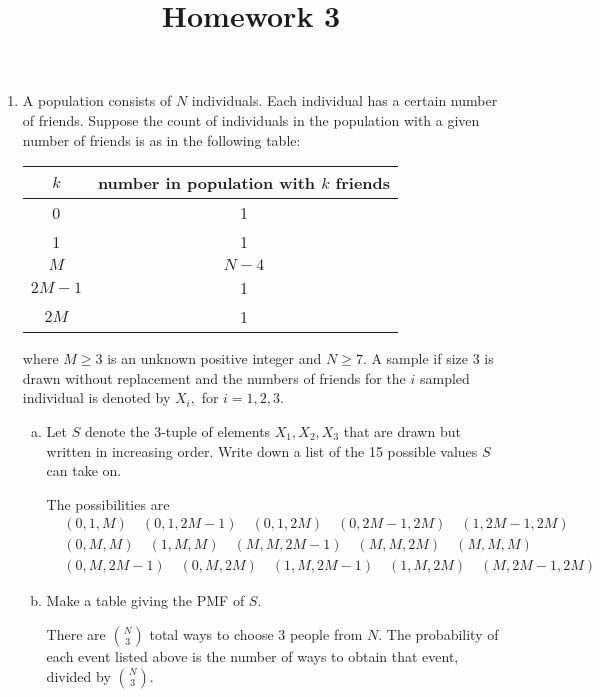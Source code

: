 \documentclass{article}
\begin{document}
\title{Homework 3}
\maketitle
\thispagestyle{fancy}

\begin{enumerate}
	\item A population consists of $N$ individuals. Each individual has a certain number of friends. Suppose the count of individuals in the population with a given number of friends is as in the following table:
		\begin{center}
			\begin{tabular}{c|c}
				$k$ & number in population with $k$ friends \\
				\hline 
				0 & 1 \\
				1 & 1 \\
				$M$ & $N-4$ \\
				$2M-1$ & 1 \\
				$2M$ & 1
			\end{tabular}
		\end{center}
		where $M\ge3$ is an unknown positive integer and $N\ge7.$ A sample if size 3 is drawn without replacement and the numbers of friends for the $i$ sampled individual is denoted by $X_i,$ for $i=1, 2, 3.$

		\begin{enumerate}[(a)]
			\item Let $S$ denote the 3-tuple of elements $X_1, X_2, X_3$ that are drawn but written in increasing order. Write down a list of the 15 possible values $S$ can take on.
				\begin{soln}
					The possibilities are 
					\begin{align*}
						&(0, 1, M)\quad(0, 1, 2M-1) \quad (0, 1, 2M) \quad (0, 2M-1, 2M)\quad (1, 2M-1, 2M) \\
						&(0, M, M)\quad(1, M, M)\quad(M, M, 2M-1)\quad(M, M, 2M)\quad (M, M, M) \\
						&(0, M, 2M-1)\quad(0, M, 2M)\quad(1, M, 2M-1)\quad(1, M, 2M)\quad(M, 2M-1, 2M)
					\end{align*}
				\end{soln}

			\item Make a table giving the PMF of $S.$
				\begin{soln}
					There are $\binom{N}{3}$ total ways to choose 3 people from $N.$ The probability of each event listed above is the number of ways to obtain that event, divided by $\binom{N}{3}.$


\end{soln}
\end{enumerate}
\end{enumerate}
\end{document}

